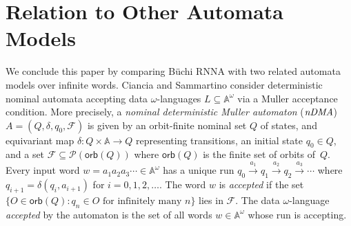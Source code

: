 \documentclass[10pt,a4paper]{amsart}
\newcommand{\compr}{:}
\newcommand{\F}{\mathcal{F}}
\numberwithin{equation}{section}
\newcommand{\xto}[1]{\xrightarrow{~#1~}}
\newcommand{\seq}{\subseteq}
\newcommand{\orb}{\mathsf{orb}}
\newcommand{\+}[1]{\mathcal{#1}\xspace}
\newcommand{\Pow}{\mathcal{P}}
\newcommand{\names}{\mathbb{A}}
\theoremstyle{definition}
\begin{document}
\section{Relation to Other Automata Models}\label{sec:relation}
We conclude this paper by comparing Büchi RNNA with two
related automata models over infinite words.  Ciancia and Sammartino
\cite{CianciaSammartino14} consider deterministic nominal automata
accepting data $\omega$-lan\-gu\-ages $L\seq \names^\omega$ via a
Muller acceptance condition. More precisely, a \emph{nominal
  deterministic Muller automaton} ($\emph{nDMA}$)
$A=(Q,\delta,q_0,\F)$ is given by an orbit-finite nominal set $Q$ of
states, and equivariant map $\delta\colon Q\times \names \to Q$
representing transitions, an initial state $q_0\in Q$, and a set
$\F\seq \Pow(\orb(Q))$ where $\orb(Q)$ is the finite set of orbits
of~$Q$. Every input word $w=a_1a_2a_3\cdots \in \names^\omega$ has a
unique run $q_0 \xto{a_1} q_1 \xto{a_2} q_2 \xto{a_3}\cdots $ where
$q_{i+1}=\delta(q_{i},a_{i+1})$ for $i=0,1,2,\ldots$. The word $w$ is
\emph{accepted} if the set $\{ O\in \orb(Q) \compr \text{$q_n\in O$ for
  infinitely many $n$} \}$ lies in $\F$. The data $\omega$-language
\emph{accepted} by the automaton is the set of all words
$w\in \names^\omega$ whose run is accepting.
\end{document}
